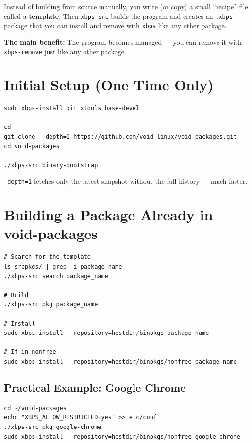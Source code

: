 \documentclass[12pt, a4paper]{book}
\begin{document}
Instead of building from source manually, you write (or copy) a small ``recipe'' file called a \textbf{template}. Then \texttt{xbps-src} builds the program and creates an \texttt{.xbps} package that you can install and remove with \texttt{xbps} like any other package.

\begin{notebox}
\textbf{The main benefit:} The program becomes managed --- you can remove it with \texttt{xbps-remove} just like any other package.
\end{notebox}

\section{Initial Setup (One Time Only)}

\begin{lstlisting}
sudo xbps-install git xtools base-devel

cd ~
git clone --depth=1 https://github.com/void-linux/void-packages.git
cd void-packages

./xbps-src binary-bootstrap
\end{lstlisting}

\begin{notebox}
\texttt{--depth=1} fetches only the latest snapshot without the full history --- much faster.
\end{notebox}

\section{Building a Package Already in void-packages}

\begin{lstlisting}
# Search for the template
ls srcpkgs/ | grep -i package_name
./xbps-src search package_name

# Build
./xbps-src pkg package_name

# Install
sudo xbps-install --repository=hostdir/binpkgs package_name

# If in nonfree
sudo xbps-install --repository=hostdir/binpkgs/nonfree package_name
\end{lstlisting}

\subsection{Practical Example: Google Chrome}
\begin{lstlisting}
cd ~/void-packages
echo "XBPS_ALLOW_RESTRICTED=yes" >> etc/conf
./xbps-src pkg google-chrome
sudo xbps-install --repository=hostdir/binpkgs/nonfree google-chrome
\end{lstlisting}
\end{document}
